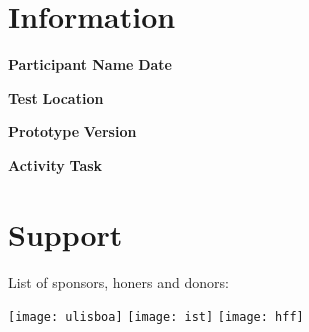 
\section*{Information}

\vspace{1cm}

\textbf{Participant Name} \hfill \textbf{Date}

\vspace{2.5cm}

\textbf{Test} \hfill \textbf{Location}

\vspace{2.5cm}

\textbf{Prototype} \hfill \textbf{Version}

\vspace{2.5cm}

\textbf{Activity} \hfill \textbf{Task}

\vfill


\section*{Support}

\hfill

List of sponsors, honers and donors:

\hfill


\hfill

\texttt{[image: ulisboa]} \hfill \texttt{[image: ist]} \hfill \texttt{[image: hff]}

\hfill

